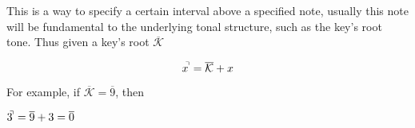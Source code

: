 \documentclass[preview]{standalone}
\begin{document}
\begin{center}
This is a way to specify a certain interval above a specified note, usually this note will be fundamental to the underlying tonal structure, such as the key's root tone. Thus given a key's root $ \overline{\mathcal{K}}$

	\[
	x^{\hspace{-0.1cm}\urcorner} = \overline{\mathcal{K}} + x
	\]

  For example, if $ \overline{\mathcal{K}} = \overline{9}$, then

	$3^{\hspace{-0.1cm}\urcorner} = \overline{9} + 3 = \overline{0}$
\end{center}
\end{document}

